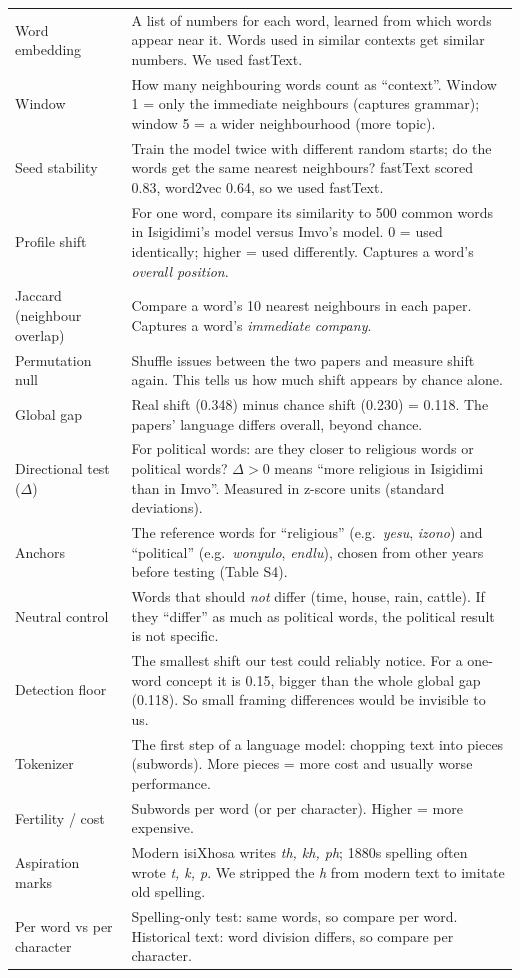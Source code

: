 \documentclass[11pt]{article}
\begin{document}
{\begin{xltabular}{\linewidth}{@{}p{3.6cm}X@{}}
\midrule
Word embedding & A list of numbers for each word, learned from which words appear near it. Words used in similar contexts get similar numbers. We used fastText. \\
Window & How many neighbouring words count as ``context''. Window 1 = only the immediate neighbours (captures grammar); window 5 = a wider neighbourhood (more topic). \\
Seed stability & Train the model twice with different random starts; do the words get the same nearest neighbours? fastText scored 0.83, word2vec 0.64, so we used fastText. \\
Profile shift & For one word, compare its similarity to 500 common words in Isigidimi's model versus Imvo's model. 0 = used identically; higher = used differently. Captures a word's \emph{overall position}. \\
Jaccard (neighbour overlap) & Compare a word's 10 nearest neighbours in each paper. Captures a word's \emph{immediate company}. \\
Permutation null & Shuffle issues between the two papers and measure shift again. This tells us how much shift appears by chance alone. \\
Global gap & Real shift (0.348) minus chance shift (0.230) = 0.118. The papers' language differs overall, beyond chance. \\
Directional test ($\Delta$) & For political words: are they closer to religious words or political words? $\Delta>0$ means ``more religious in Isigidimi than in Imvo''. Measured in z-score units (standard deviations). \\
Anchors & The reference words for ``religious'' (e.g.\ \emph{yesu}, \emph{izono}) and ``political'' (e.g.\ \emph{wonyulo}, \emph{endlu}), chosen from other years before testing (Table S4). \\
Neutral control & Words that should \emph{not} differ (time, house, rain, cattle). If they ``differ'' as much as political words, the political result is not specific. \\
Detection floor & The smallest shift our test could reliably notice. For a one-word concept it is 0.15, bigger than the whole global gap (0.118). So small framing differences would be invisible to us. \\
\midrule
Tokenizer & The first step of a language model: chopping text into pieces (subwords). More pieces = more cost and usually worse performance. \\
Fertility / cost & Subwords per word (or per character). Higher = more expensive. \\
Aspiration marks & Modern isiXhosa writes \emph{th, kh, ph}; 1880s spelling often wrote \emph{t, k, p}. We stripped the \emph{h} from modern text to imitate old spelling. \\
Per word vs per character & Spelling-only test: same words, so compare per word. Historical text: word division differs, so compare per character. \\
\bottomrule
\end{xltabular}}
\end{document}
